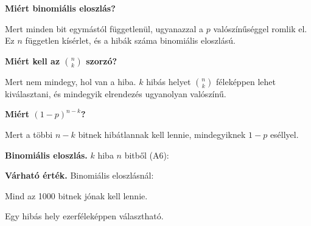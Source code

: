 \begin{elmelet}
\textbf{Miért binomiális eloszlás?}\par Mert minden bit egymástól függetlenül, ugyanazzal a $p$ valószínűséggel romlik el. Ez $n$ független kísérlet, és a hibák száma binomiális eloszlású.

\textbf{Miért kell az $\binom{n}{k}$ szorzó?}\par Mert nem mindegy, hol van a hiba. $k$ hibás helyet $\binom{n}{k}$ féleképpen lehet kiválasztani, és mindegyik elrendezés ugyanolyan valószínű.

\textbf{Miért $(1-p)^{n-k}$?}\par Mert a többi $n-k$ bitnek hibátlannak kell lennie, mindegyiknek $1-p$ eséllyel.
\end{elmelet}
\begin{elmelet}
\textbf{Binomiális eloszlás.} $k$ hiba $n$ bitből (A6):
\begin{center}\end{center}


\textbf{Várható érték.} Binomiális eloszlásnál:
\begin{center}\end{center}

\end{elmelet}

Mind az 1000 bitnek jónak kell lennie.

\begin{center}\end{center}

\begin{center}\end{center}

\begin{center}\end{center}

Egy hibás hely ezerféleképpen választható.

\begin{center}\end{center}

